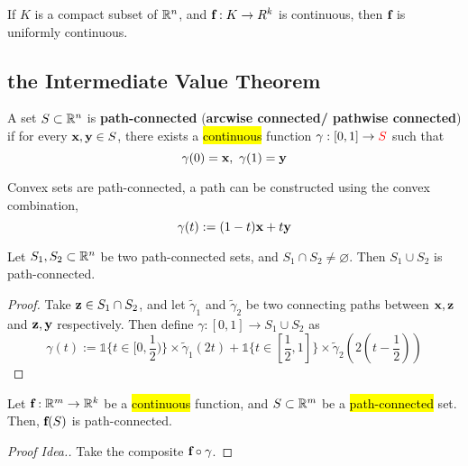 \documentclass[11pt]{article}
\newcommand{\vef}[0]{\ve{f}}
\begin{document}
				\begin{theorem}
					If $K$ is a compact subset of $\mathbb{R}^n$, and $\vef: K \to R^k$ is continuous, then $\vef$ is uniformly continuous.
				\end{theorem}
				
		\subsection{the Intermediate Value Theorem}
			\begin{definition}
				A set $S \subset \mathbb{R}^n$ is \textbf{path-connected} (\textbf{arcwise connected/ pathwise connected}) if for every $\textbf{x}, \textbf{y} \in S$, there exists a \hl{continuous} function $\gamma: [0, 1] \to \textcolor{red}{S}$ such that
				\begin{equation}
					\gamma(0) = \textbf{x},\ \gamma(1) = \textbf{y}
				\end{equation}
			\end{definition}
			
			\begin{example}
				Convex sets are path-connected, a path can be constructed using the convex combination,
				\begin{equation}
					\gamma(t) := (1 - t) \textbf{x} + t \textbf{y}
				\end{equation}
			\end{example}
			
			\begin{proposition}
				Let $S_1, S_2 \subset \mathbb{R}^n$ be two path-connected sets, and $S_1 \cap S_2 \neq \varnothing$. Then $S_1 \cup S_2$ is path-connected.
				\begin{proof}
					Take $\textbf{z} \in S_1 \cap S_2$, and let $\tilde{\gamma}_1$ and $\tilde{\gamma}_2$ be two connecting paths between $\textbf{x}, \textbf{z}$ and $\textbf{z}, \textbf{y}$ respectively. Then define $\gamma: [0, 1] \to S_1 \cup S_2$ as 
					\begin{equation}
						\gamma(t) := \mathds{1}\{t \in [0, \frac{1}{2})\} \times \tilde{\gamma}_1(2t) + \mathds{1}\{t \in [\frac{1}{2}, 1]\} \times \tilde{\gamma}_2(2(t-\frac{1}{2}))
					\end{equation}
				\end{proof}
			\end{proposition}
			
			\begin{theorem}
				Let $\trans{\vef}{\R^m}{\R^k}$ be a \hl{continuous} function, and $S \subset \mathbb{R}^m$ be a \hl{path-connected} set. Then, $\vef(S)$ is path-connected.
				\begin{proof}[Proof Idea.]
					Take the composite $\vef \circ \gamma$.
				\end{proof}
			\end{theorem}
			
\end{document}
